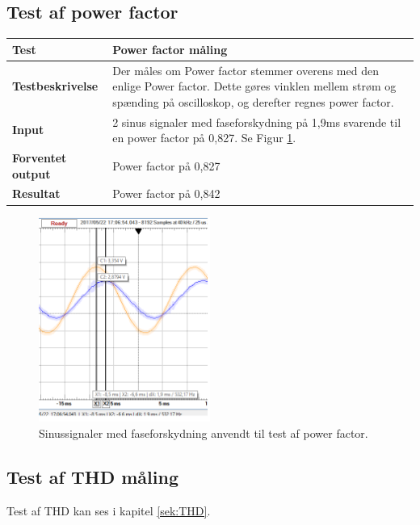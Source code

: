 \subsection*{Test af power factor}
\begin{center}
	\begin{tabular}{ | m{} | m{}|} 
		\hline
		\textbf{Test}					&Power factor måling \\ \hline
		\textbf{Testbeskrivelse}		&Der måles om Power factor stemmer overens med den enlige Power factor. Dette gøres vinklen mellem strøm og spænding på oscilloskop, og derefter regnes power factor.   \\ \hline
		\textbf{Input}					&2 sinus signaler med faseforskydning på 1,9ms svarende til en power factor på 0,827. Se Figur \ref{fig:MaalTest}. \\ \hline
		\textbf{Forventet output}		&Power factor på 0,827\\ \hline
		\textbf{Resultat}				&Power factor på 0,842 \\ \hline
	\end{tabular}
\end{center}   

\begin{figure}[H] %
	\centering
	\includegraphics[width=0.5\textwidth]{Figure/MaalTest}
	\caption{Sinussignaler med faseforskydning anvendt til test af power factor.}
	\label{fig:MaalTest}
\end{figure}


\subsection*{Test af THD måling}
Test af THD kan ses i kapitel \ref{sek:THD}. 